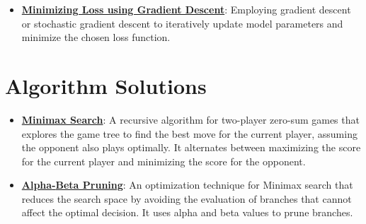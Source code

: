 \documentclass{article}%
\begin{document}
\begin{itemize}[leftmargin=*]
\item \href{https://purdue.brightspace.com/d2l/common/assets/pdfjs-d2l-dist/1.0.14-legacy/web/viewer.html?file=%2Fcontent%2Fenforced%2F1095467-wl.202510.CS.24300.001%2F05L2-ML Basics.pdf%3Fou%3D1095467&lang=en-us&container=d2l-fileviewer-rendered-pdf&fullscreen=d2l-fileviewer-rendered-pdf-dialog&height=667#page=28}{\textbf{Minimizing Loss using Gradient Descent}}: Employing gradient descent or stochastic gradient descent to iteratively update model parameters and minimize the chosen loss function.%
\end{itemize}

%
\section{Algorithm Solutions}%
\label{sec:AlgorithmSolutions}%
\begin{itemize}[leftmargin=*]%
\item \href{https://purdue.brightspace.com/d2l/common/assets/pdfjs-d2l-dist/1.0.14-legacy/web/viewer.html?file=%2Fcontent%2Fenforced%2F1095467-wl.202510.CS.24300.001%2F02L2-Intro.pdf%3Fou%3D1095467&lang=en-us&container=d2l-fileviewer-rendered-pdf&fullscreen=d2l-fileviewer-rendered-pdf-dialog&height=667#page=22}{\textbf{Minimax Search}}: A recursive algorithm for two-player zero-sum games that explores the game tree to find the best move for the current player, assuming the opponent also plays optimally. It alternates between maximizing the score for the current player and minimizing the score for the opponent.%
\item \href{https://purdue.brightspace.com/d2l/common/assets/pdfjs-d2l-dist/1.0.14-legacy/web/viewer.html?file=%2Fcontent%2Fenforced%2F1095467-wl.202510.CS.24300.001%2F02L2-Intro.pdf%3Fou%3D1095467&lang=en-us&container=d2l-fileviewer-rendered-pdf&fullscreen=d2l-fileviewer-rendered-pdf-dialog&height=667#page=23}{\textbf{Alpha{-}Beta Pruning}}: An optimization technique for Minimax search that reduces the search space by avoiding the evaluation of branches that cannot affect the optimal decision. It uses alpha and beta values to prune branches.%
\end{itemize}%
\end{document}
